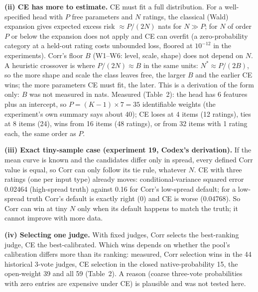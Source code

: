 \documentclass[11pt]{article}
\begin{document}
\textbf{(ii) CE has more to estimate.} CE must fit a full distribution. For a well-specified head with $P$ free parameters and $N$ ratings, the classical (Wald) expansion gives expected excess risk $\approx P/(2N)$ nats for $N\gg P$; for $N$ of order $P$ or below the expansion does not apply and CE can overfit (a zero-probability category at a held-out rating costs unbounded loss, floored at $10^{-12}$ in the experiments). Corr's floor $B$ (W1--W6: level, scale, shape) does not depend on $N$. A heuristic crossover is where $P/(2N)\approx B$ in the same units: $N^\ast\approx P/(2B)$, so the more shape and scale the class leaves free, the larger $B$ and the earlier CE wins; the more parameters CE must fit, the later. This is a derivation of the form only: $B$ was not measured in nats. Measured (Table~2): the head has 6 features plus an intercept, so $P=(K-1)\times7=35$ identifiable weights (the experiment's own summary says about 40); CE loses at 4 items (12 ratings), ties at 8 items (24), wins from 16 items (48 ratings), or from 32 items with 1 rating each, the same order as $P$.

\textbf{(iii) Exact tiny-sample case (experiment 19, Codex's derivation).} If the mean curve is known and the candidates differ only in spread, every defined Corr value is equal, so Corr can only follow its tie rule, whatever $N$. CE with three ratings (one per input type) already moves: conditional-variance squared error 0.02464 (high-spread truth) against 0.16 for Corr's low-spread default; for a low-spread truth Corr's default is exactly right (0) and CE is worse (0.04768). So Corr can win at tiny $N$ only when its default happens to match the truth; it cannot improve with more data.

\textbf{(iv) Selecting one judge.} With fixed judges, Corr selects the best-ranking judge, CE the best-calibrated. Which wins depends on whether the pool's calibration differs more than its ranking: measured, Corr selection wins in the 44 historical 3-vote judges, CE selection in the closed native-probability 15, the open-weight 39 and all 59 (Table~2). A reason (coarse three-vote probabilities with zero entries are expensive under CE) is plausible and was not tested here.
\end{document}
